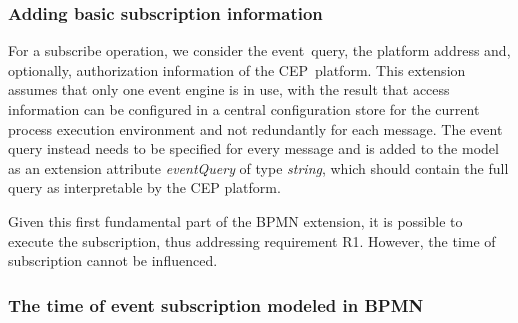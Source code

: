
\subsubsection*{Adding basic subscription information}\label{ch:bpmnx:basic}

For a subscribe operation, we consider the event~query, the platform address and, optionally, authorization information of the CEP~platform.
This extension assumes that only one event engine is in use, with the result that access information can be configured in a central configuration store for the current process execution environment and not redundantly for each message.
The event query instead needs to be specified for every message and is added to the model as an extension attribute \textit{eventQuery} of type \textit{string}, which should contain the full query as interpretable by the CEP platform.

Given this first fundamental part of the BPMN extension, it is possible to execute the subscription, thus addressing requirement R1. However, the time of subscription cannot be influenced.

\subsubsection*{The time of event subscription modeled in BPMN}\label{ch:bpmnx:subscriptiontimes}

